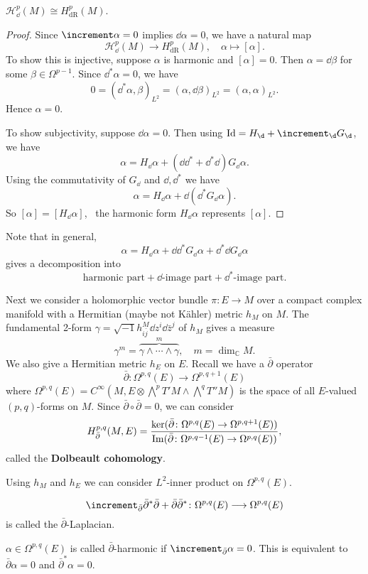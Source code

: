 \documentclass[12pt]{article}
\begin{document}
\begin{theorem}
  \(\mathcal{H}_{\dd{}}^p(M)\cong H_{\mathrm{dR}}^p(M)\).
\end{theorem}
\begin{proof}
  Since \(\lap\alpha=0\) implies \(\dd{\alpha}=0\), we have a natural map \[
    \mathcal{H}_{\dd{}}^p(M)\longrightarrow H_{\mathrm{dR}}^p(M),\quad
    \alpha\longmapsto [\alpha]
  .\] To show this is injective, suppose \(\alpha\) is harmonic and \([\alpha]=0\).
  Then \(\alpha=\dd{\beta}\) for some \(\beta\in \Omega^{p-1}\). Since \(\dd^*\alpha=0
  \), we have \[
    0=(\dd^*\alpha,\beta)_{L^2}=(\alpha,\dd{\beta})_{L^2}=(\alpha,\alpha)_{L^2}
  .\] Hence \(\alpha=0\).

  To show subjectivity, suppose \(\dd{\alpha}=0\). Then using
  \(\op{Id}=H_{\dd{}}+\lap_{\dd{}}G_{\dd{}}\), we have \[
    \alpha=H_{\dd{}}\alpha+(\dd \dd^*+\dd^*\dd)G_{\dd{}}\alpha
  .\] Using the commutativity of \(G_{\dd{}}\) and \(\dd,\dd^*\) we have \[
    \alpha=H_{\dd{}}\alpha+\dd{(\dd^*G_{\dd{}}\alpha)}
  .\] So \([\alpha]=[H_{\dd{}}\alpha]\), \ie\ the harmonic form \(H_{\dd{}}\alpha\)
  represents \([\alpha]\).
\end{proof}
Note that in general, \[
  \alpha=H_{\dd{}}\alpha+\dd \dd^*G_{\dd{}}\alpha+\dd^*\dd G_{\dd{}}\alpha
\] gives a decomposition into \[
  \text{harmonic part}+\dd\text{-image part}+\dd^*\text{-image part}
.\] 

Next we consider a holomorphic vector bundle \(\pi\colon E\to M\) over a compact
complex manifold with a Hermitian (maybe not K\"ahler) metric \(h_{M}\) on \(M\).
The fundamental 2-form \(\gamma=\sqrt{-1}h^M_{i\bar{j}}\dd{z^i}\dd{\bar{z}^j}\) of
\(h_M\) gives a measure \[
  \gamma^m=\overbrace{\gamma\wedge \cdots \wedge \gamma}^m,\quad m=\dim_{\mathbb{C}}M
.\] We also give a Hermitian metric \(h_E\) on \(E\). Recall we have a
\(\bar{\partial}\) operator \[
  \bar{\partial}\colon \Omega^{p,q}(E)\longrightarrow\Omega^{p,q+1}(E)
\] where \(\Omega^{p,q}(E)=C^\infty(M,E\otimes\bigwedge^p T'M\wedge\bigwedge^q T''M)\)
is the space of all \(E\)-valued \((p,q)\)-forms on \(M\). Since
\(\bar{\partial}\circ \bar{\partial}=0\), we can consider \[
  H_{\bar{\partial}}^{p,q}(M,E)
  =\frac{\ker(\bar{\partial}\colon \Omega^{p,q}(E)\to \Omega^{p,q+1}(E))}
  {\operatorname{Im}(\bar{\partial}\colon \Omega^{p,q-1}(E)\to \Omega^{p,q}(E))},
\] called the \textbf{Dolbeault cohomology}.

Using \(h_M\) and \(h_E\) we can consider \(L^2\)-inner product on \(\Omega^{p,q}(E)\).

\begin{definition}
  \[
    \lap_{\bar{\partial}}\bar{\partial}^*\bar{\partial}+\bar{\partial}\bar{\partial}^*
    \colon \Omega^{p,q}(E)\longrightarrow\Omega^{p,q}(E)
  \]  is called the \(\bar{\partial}\)-Laplacian.
\end{definition}
\begin{definition}
  \(\alpha\in \Omega^{p,q}(E)\) is called \(\bar{\partial}\)-harmonic if 
  \(\lap_{\bar{\partial}}\alpha=0\). This is equivalent to \(\bar{\partial}\alpha=0\)
  and \(\bar{\partial}^*\alpha=0\).
\end{definition}
\end{document}
